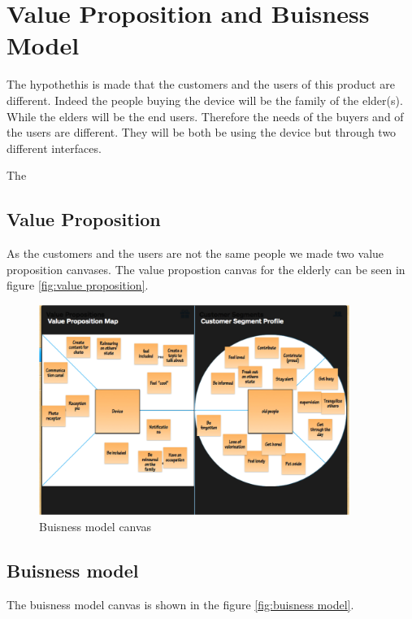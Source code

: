 \section{Value Proposition and Buisness Model}
The hypothethis is made that the customers and the users of this product are different. Indeed the people buying the device will be the family of the elder(s). While the elders will be the end users. Therefore the needs of the buyers and of the users are different. They will be both be using the device but through two different interfaces.

The

\subsection{Value Proposition}
As the customers and the users are not the same people we made two value proposition canvases.
The value propostion canvas for the elderly can be seen in figure \ref{fig:value proposition}.

\begin{figure}[!htb]
    \centering
    \includegraphics[width=0.9\textwidth,keepaspectratio]{chap/marketFig/elderly_value_prop_canvas.png}
    \caption{Buisness model canvas}
    \label{fig:elders value proposition}
\end{figure}

\subsection{Buisness model}

The buisness model canvas is shown in the figure \ref{fig:buisness model}.

